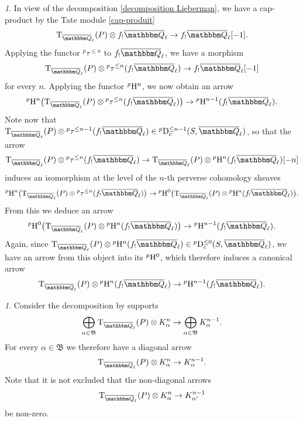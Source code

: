 \documentclass[12pt,english]{smfart}
\numberwithin{equation}{subsection}
\theoremstyle{remark}
\newtheorem{numero}[equation]{}
\newcommand\rmT{{\rm T}}
\newcommand\FrakB{{\mathfrak B}}
\newcommand\QQ{{\mathbbm Q}}
\newcommand\rmH{{\rm H}}
\newcommand\rmD{{\rm D}}
\newcommand\Ql{{\overline\QQ_\ell}}
\begin{document}
\begin{numero}\label{cap-produit module de Tate}
In view of the decomposition \ref{decomposition Lieberman}, we have a cap-product by the Tate module \ref{cap-produit}
$$\rmT_\Ql(P)\otimes f_!\Ql \rightarrow f_!\Ql[-1].$$
Applying the functor ${}^p\tau^{\leq n}$ to $f_!\Ql$, we have a morphism
$$\rmT_\Ql(P)\otimes {}^p\tau^{\leq n}(f_!\Ql) \rightarrow f_!\Ql[-1]$$
for every $n$. Applying the functor ${}^p\rmH^n$, we now obtain an arrow
$${}^p\rmH^n\big(\rmT_\Ql(P)\otimes {}^p\tau^{\leq n}(f_!\Ql)\big) \rightarrow {}^p\rmH^{n-1}(f_!\Ql).$$
Note now that $\rmT_\Ql(P)\otimes {}^p\tau^{\leq n-1}(f_!\Ql)\in {}^p\rmD_c^{\leq n-1}(S,\Ql)$, so that the arrow
$$\rmT_\Ql(P)\otimes {}^p\tau^{\leq n}(f_!\Ql) \rightarrow \rmT_\Ql(P)\otimes {}^p\rmH^n(f_!\Ql)[-n]$$
induces an isomorphism at the level of the $n$-th perverse cohomology sheaves
$${}^p\rmH^n\big(\rmT_\Ql(P)\otimes {}^p\tau^{\leq n}(f_!\Ql)\big) \rightarrow {}^p\rmH^0\big(\rmT_\Ql(P)\otimes {}^p\rmH^n(f_!\Ql)\big).$$
From this we deduce an arrow
$${}^p\rmH^0\big(\rmT_\Ql(P)\otimes {}^p\rmH^n(f_!\Ql)\big) \rightarrow {}^p\rmH^{n-1}(f_!\Ql).$$
Again, since $\rmT_\Ql(P)\otimes {}^p\rmH^n(f_!\Ql)\in {}^p\rmD_c^{\leq 0}(S,\Ql)$, we have an arrow from this object into its ${}^p\rmH^0$, which therefore induces a canonical arrow
$$\rmT_\Ql(P)\otimes {}^p\rmH^n(f_!\Ql) \rightarrow {}^p\rmH^{n-1}(f_!\Ql).$$
\end{numero}

\begin{numero}\label{fleche diagonale}
Consider the decomposition by supports
$$\bigoplus_{\alpha\in\FrakB}\rmT_\Ql(P)\otimes K^n_\alpha \rightarrow \bigoplus_{\alpha\in\FrakB} K^{n-1}_\alpha.$$
For every $\alpha\in\FrakB$ we therefore have a diagonal arrow
$$\rmT_\Ql(P)\otimes K^n_\alpha \rightarrow K^{n-1}_\alpha.$$
Note that it is not excluded that the non-diagonal arrows
$$\rmT_\Ql(P)\otimes K^n_\alpha \rightarrow K^{n-1}_{\alpha'}$$
be non-zero.
\end{numero}
\end{document}
